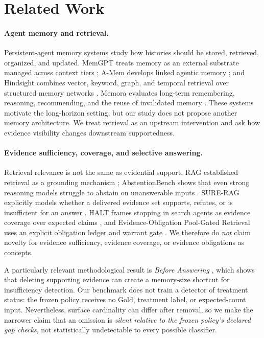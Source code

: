 
\section{Related Work}
\label{sec:related}

\paragraph{Agent memory and retrieval.}
Persistent-agent memory systems study how histories should be stored, retrieved, organized,
and updated. MemGPT treats memory as an external substrate managed across context tiers
\citep{packer2023memgpt}; A-Mem develops linked agentic memory
\citep{xu2025amem}; and Hindsight combines vector, keyword, graph, and temporal retrieval
over structured memory networks \citep{latimer2026hindsight}. Memora evaluates long-term
remembering, reasoning, recommending, and the reuse of invalidated memory
\citep{uddin2026memora}. These systems motivate the long-horizon setting, but our study does
not propose another memory architecture. We treat retrieval as an upstream intervention and
ask how evidence visibility changes downstream supportedness.

\paragraph{Evidence sufficiency, coverage, and selective answering.}
Retrieval relevance is not the same as evidential support. RAG established retrieval as a
grounding mechanism \citep{lewis2020rag}; AbstentionBench shows that even strong reasoning
models struggle to abstain on unanswerable inputs \citep{kirichenko2025abstentionbench}.
SURE-RAG explicitly models whether a delivered evidence set supports, refutes, or is
insufficient for an answer \citep{qiu2026surerag}. HALT frames stopping in search agents as
evidence coverage over expected claims \citep{roh2026halt}, and
Evidence-Obligation Pool-Gated Retrieval uses an explicit obligation ledger and warrant
gate \citep{kim2026obligation}. We therefore do \emph{not} claim novelty for evidence
sufficiency, evidence coverage, or evidence obligations as concepts.

A particularly relevant methodological result is \emph{Before Answering}
\citep{mondal2026before}, which shows that deleting supporting evidence can create a
memory-size shortcut for insufficiency detection. Our benchmark does not train a detector
of treatment status: the frozen policy receives no Gold, treatment label, or expected-count
input. Nevertheless, surface cardinality can differ after removal, so we make the narrower
claim that an omission is \emph{silent relative to the frozen policy's declared gap checks},
not statistically undetectable to every possible classifier.

